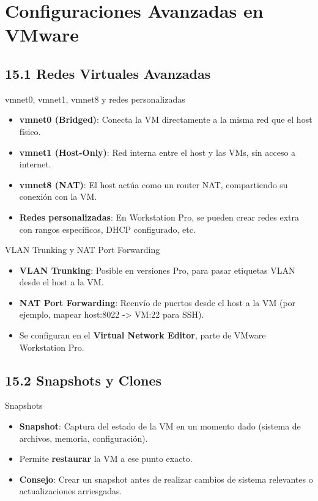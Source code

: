 \documentclass{beamer}
\begin{document}
\section{Configuraciones Avanzadas en VMware}

\subsection{15.1 Redes Virtuales Avanzadas}
\begin{frame}{vmnet0, vmnet1, vmnet8 y redes personalizadas}
	\begin{itemize}
		\item \textbf{vmnet0 (Bridged)}: Conecta la VM directamente a la misma red que el host físico.
		\item \textbf{vmnet1 (Host-Only)}: Red interna entre el host y las VMs, sin acceso a internet.
		\item \textbf{vmnet8 (NAT)}: El host actúa como un router NAT, compartiendo su conexión con la VM.
		\item \textbf{Redes personalizadas}: En Workstation Pro, se pueden crear redes extra con rangos específicos, DHCP configurado, etc.
	\end{itemize}
\end{frame}

\begin{frame}{VLAN Trunking y NAT Port Forwarding}
	\begin{itemize}
		\item \textbf{VLAN Trunking}: Posible en versiones Pro, para pasar etiquetas VLAN desde el host a la VM.
		\item \textbf{NAT Port Forwarding}: Reenvío de puertos desde el host a la VM (por ejemplo, mapear host:8022 -> VM:22 para SSH).
		\item Se configuran en el \textbf{Virtual Network Editor}, parte de VMware Workstation Pro.
	\end{itemize}
\end{frame}

\subsection{15.2 Snapshots y Clones}
\begin{frame}{Snapshots}
	\begin{itemize}
		\item \textbf{Snapshot}: Captura del estado de la VM en un momento dado (sistema de archivos, memoria, configuración).
		\item Permite \textbf{restaurar} la VM a ese punto exacto.
		\item \textbf{Consejo}: Crear un snapshot antes de realizar cambios de sistema relevantes o actualizaciones arriesgadas.
	\end{itemize}
\end{frame}
\end{document}
